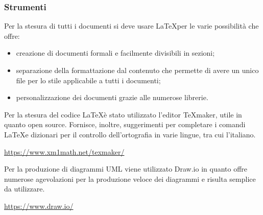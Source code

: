 \subsubsection{Strumenti}
\myparagraph{\LaTeX}
Per la stesura di tutti i documenti si deve usare \LaTeX per le varie possibilità che offre:
\begin{itemize}
\item creazione di documenti formali e facilmente divisibili in sezioni;
\item separazione della formattazione dal contenuto che permette di avere un unico file per lo stile applicabile a tutti i documenti;
\item personalizzazione dei documenti grazie alle numerose librerie.
\end{itemize}

Per la stesura del codice \LaTeX è stato utilizzato l'editor \TeX maker, utile in quanto open source. Fornisce, inoltre, suggerimenti per completare i comandi \LaTeX e dizionari per il controllo dell'ortografia in varie lingue, tra cui l'italiano.
\begin{center}
\url{https://www.xm1math.net/texmaker/}
\end{center}

Per la produzione di diagrammi UML viene utilizzato Draw.io in quanto offre numerose agevolazioni per la produzione veloce dei diagrammi e risulta semplice da utilizzare.
\begin{center}
\url{https://www.draw.io/}
\end{center}